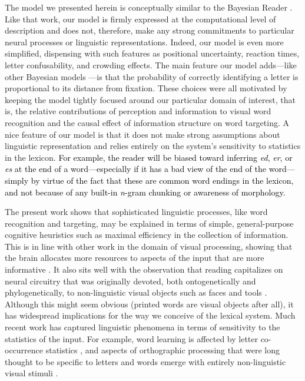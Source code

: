 \documentclass[doc,biblatex]{apa7}
\newcommand\newmaterial[1]{\textcolor{black}{#1}}
\begin{document}
The model we presented herein is conceptually similar to the Bayesian Reader \parencite{Norris:2006, Norris:2009, Norris:2012}. Like that work, our model is firmly expressed at the computational level of description \parencite{Marr:1982} and does not, therefore, make any strong commitments to particular neural processes or linguistic representations. Indeed, our model is even more simplified, dispensing with such features as positional uncertainty, reaction times, letter confusability, and crowding effects. The main feature our model adds---like other Bayesian models \parencite{SmithChan:2010, Bicknell:2012, Valdois:2021}---is that the probability of correctly identifying a letter is proportional to its distance from fixation. These choices were all motivated by keeping the model tightly focused around our particular domain of interest, that is, the relative contributions of perception and information to visual word recognition and the causal effect of information structure on word targeting. A nice feature of our model is that it does not make strong assumptions about linguistic representation and relies entirely on the system's sensitivity to statistics in the lexicon. \newmaterial{For example, the reader will be biased toward inferring \textit{ed}, \textit{er}, or \textit{es} at the end of a word---especially if it has a bad view of the end of the word---simply by virtue of the fact that these are common word endings in the lexicon, and not because of any built-in \textit{n}-gram chunking or awareness of morphology.}

The present work shows that sophisticated linguistic processes, like word recognition and targeting, may be explained in terms of simple, general-purpose cognitive heuristics such as maximal efficiency in the collection of information. This is in line with other work in the domain of visual processing, showing that the brain allocates more resources to aspects of the input that are more informative \parencite{Simoncelli:2001, Hermundstad:2014}. It also sits well with the observation that reading capitalizes on neural circuitry that was originally devoted, both ontogenetically and phylogenetically, to non-linguistic visual objects such as faces and tools \parencite{Dehaene:2011, Hervais:2019}. Although this might seem obvious (printed words are visual objects after all), it has widespread implications for the way we conceive of the lexical system. Much recent work has captured linguistic phenomena in terms of sensitivity to the statistics of the input. For example, word learning is affected by letter co-occurrence statistics \parencite{Chetail:2017, Lelonkiewicz:2020}, and aspects of orthographic processing that were long thought to be specific to letters and words emerge with entirely non-linguistic visual stimuli \parencite{Vidal:2021}.
\end{document}
